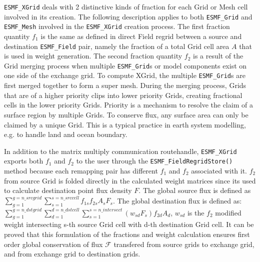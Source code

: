 {\tt ESMF\_XGrid} deals with 2 distinctive kinds of fraction for each Grid or Mesh cell
involved in its creation. The following description applies to both {\tt ESMF\_Grid} 
and {\tt ESMF\_Mesh} involved in the {\tt ESMF\_XGrid} creation process.
The first fraction quantity $f_1$ is the same as defined in direct
Field regrid between a source and destination {\tt ESMF\_Field} pair, namely the fraction
of a total Grid cell area $A$ that is used in weight generation. The second fraction quantity $f_2$
is a result of the Grid merging process when multiple {\tt ESMF\_Grid}s or model components
exist on one side of the exchange grid. To compute XGrid, the multiple {\tt ESMF\_Grid}s
are first merged together to form a super mesh. During the merging process, Grids that are
of a higher priority clips into lower priority Grids, creating fractional cells in the lower
priority Grids. Priority is a mechanism to resolve the claim of a surface region by multiple
Grids. To conserve flux, any surface area can only be claimed by a unique Grid. This is
a typical practice in earth system modelling, e.g. to handle land and ocean boundary.

In addition to the matrix multiply communication routehandle, 
{\tt ESMF\_XGrid} exports both $f_1$ and $f_2$ to the user through the {\tt ESMF\_FieldRegridStore()} method
because each remapping pair has different $f_1$ and $f_2$ associated with it. $f_2$ from source Grid is 
folded directly in the calculated weight matrices since its used to calculate destination point flux
density $F$. The global source flux is defined as $\sum_{g=1}^{g=n\_srcgrid}\sum_{s=1}^{s=n\_srccell}{ f_{1s} f_{2s} A_s F_s }$.
The global destination flux is defined as: 
$\sum_{g=1}^{g=n\_dstgrid}\sum_{d=1}^{d=n\_dstcell}{ \sum_{s=1}^{s=n\_intersect}(w_{sd} F_s) f_{2d} A_d}$, $w_{sd}$ is the
$f_2$ modified weight intersecting s-th source Grid cell with d-th destination Grid cell.
It can be proved that this formulation of the fractions and 
weight calculation ensures first order global conservation of
flux $\mathcal{F}$ transfered from source grids to exchange grid, and from exchange grid to destination grids.

